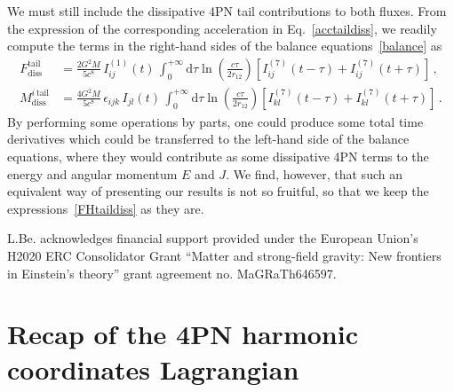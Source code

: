 \documentclass[prd,preprint,superscriptaddress,tightenlines,nofootinbib,
  eqsecnum,showpacs]{revtex4}
\newcommand{\ud}{\mathrm{d}}
\begin{document}
We must still include the dissipative 4PN tail contributions to both fluxes.
From the expression of the corresponding acceleration in
Eq.~\eqref{acctaildiss}, we readily compute the terms in the right-hand sides of
the balance equations~\eqref{balance} as
%
\begin{subequations}\label{FHtaildiss}
\begin{align}
F^\text{tail}_\text{diss} &= \frac{2G^2M}{5c^8} \,I_{ij}^{(1)}(t)
\,\int_0^{+\infty} \ud\tau
\ln\left(\frac{c\tau}{2r_{12}}\right)\left[I_{ij}^{(7)}(t-\tau) +
  I_{ij}^{(7)}(t+\tau)\right]\,,\\
M^{i\,\text{tail}}_\text{diss} &= \frac{4G^2M}{5c^8} \,\epsilon_{ijk}\,I_{jl}(t)
\,\int_0^{+\infty} \ud\tau
\ln\left(\frac{c\tau}{2r_{12}}\right)\left[I_{kl}^{(7)}(t-\tau) +
  I_{kl}^{(7)}(t+\tau)\right]\,.
\end{align}
\end{subequations}
%
By performing some operations by parts, one could produce some total time
derivatives which could be transferred to the left-hand side of the balance equations,
where they would contribute as some dissipative 4PN terms to the energy and
angular momentum $E$ and $J$. We find, however, that such an equivalent way of
presenting our results is not so fruitful, so that we keep the
expressions~\eqref{FHtaildiss} as they are.



\acknowledgments

L.Be. acknowledges financial support provided under the European Union's H2020
ERC Consolidator Grant ``Matter and strong-field gravity: New frontiers in
Einstein's theory'' grant agreement no. MaGRaTh646597.

\appendix

\section{Recap of the 4PN harmonic coordinates Lagrangian} 
\label{sec:Lgen} 
\end{document}
